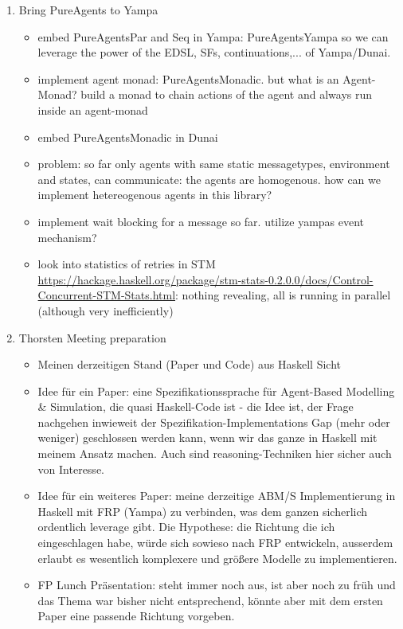 \begin{enumerate}
\item Bring PureAgents to Yampa
	\begin{itemize}
		\item embed PureAgentsPar and Seq in Yampa: PureAgentsYampa so we can leverage the power of the EDSL, SFs, continuations,... of Yampa/Dunai.
		\item implement agent monad: PureAgentsMonadic. but what is an Agent-Monad? build a monad to chain actions of the agent and always run inside an agent-monad
		\item embed PureAgentsMonadic in Dunai
		\item problem: so far only agents with same static messagetypes, environment and states, can communicate: the agents are homogenous. how can we implement hetereogenous agents in this library?
		\item implement wait blocking for a message so far. utilize yampas event mechanism?
		\item look into statistics of retries in STM \url{https://hackage.haskell.org/package/stm-stats-0.2.0.0/docs/Control-Concurrent-STM-Stats.html}: nothing revealing, all is running in parallel (although very inefficiently)
	\end{itemize}

\item Thorsten Meeting preparation
	\begin{itemize}
		\item Meinen derzeitigen Stand (Paper und Code) aus Haskell Sicht
		\item Idee für ein Paper: eine Spezifikationssprache für Agent-Based Modelling \& Simulation, die quasi Haskell-Code ist - die Idee ist, der Frage nachgehen inwieweit der Spezifikation-Implementations Gap (mehr oder weniger) geschlossen werden kann, wenn wir das ganze in Haskell mit meinem Ansatz machen. Auch sind reasoning-Techniken hier sicher auch von Interesse.
		\item Idee für ein weiteres Paper: meine derzeitige ABM/S Implementierung in Haskell mit FRP (Yampa) zu verbinden, was dem ganzen sicherlich ordentlich leverage gibt. Die Hypothese: die Richtung die ich eingeschlagen habe, würde sich sowieso nach FRP entwickeln, ausserdem erlaubt es wesentlich komplexere und größere Modelle zu implementieren.
		\item FP Lunch Präsentation: steht immer noch aus, ist aber noch zu früh und das Thema war bisher nicht entsprechend, könnte aber mit dem ersten Paper eine passende Richtung vorgeben.
	\end{itemize}


\end{enumerate}
